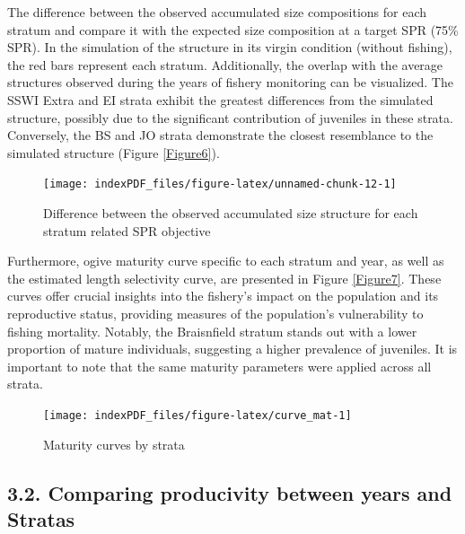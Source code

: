 \documentclass[
]{article}
\begin{document}
The difference between the observed accumulated size compositions for
each stratum and compare it with the expected size composition at a
target SPR (75\% SPR). In the simulation of the structure in its virgin
condition (without fishing), the red bars represent each stratum.
Additionally, the overlap with the average structures observed during
the years of fishery monitoring can be visualized. The SSWI Extra and EI
strata exhibit the greatest differences from the simulated structure,
possibly due to the significant contribution of juveniles in these
strata. Conversely, the BS and JO strata demonstrate the closest
resemblance to the simulated structure (Figure \ref{Figure6}).

\begin{figure}[H]

{\centering \texttt{[image: indexPDF\_files/figure-latex/unnamed-chunk-12-1]} 

}

\caption{\label{Figure6}Difference between the observed accumulated size structure for each stratum related SPR objective}\label{fig:unnamed-chunk-12}
\end{figure}

Furthermore, ogive maturity curve specific to each stratum and year, as
well as the estimated length selectivity curve, are presented in Figure
\ref{Figure7}. These curves offer crucial insights into the fishery's
impact on the population and its reproductive status, providing measures
of the population's vulnerability to fishing mortality. Notably, the
Braisnfield stratum stands out with a lower proportion of mature
individuals, suggesting a higher prevalence of juveniles. It is
important to note that the same maturity parameters were applied across
all strata.

\begin{figure}[H]

{\centering \texttt{[image: indexPDF\_files/figure-latex/curve\_mat-1]} 

}

\caption{\label{Figure7}Maturity curves by strata}\label{fig:curve_mat}
\end{figure}

\hypertarget{comparing-producivity-between-years-and-stratas}{%
\subsection{3.2. Comparing producivity between years and
Stratas}\label{comparing-producivity-between-years-and-stratas}}
\end{document}
